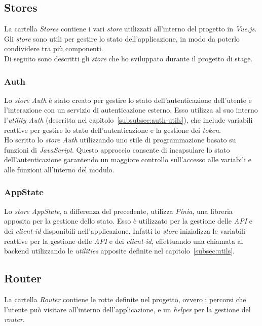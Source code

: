 \subsection{Stores}\label{subsec:store}
La cartella \textit{Stores} contiene i vari \textit{store} utilizzati all'interno del progetto in \textit{Vue.js}. Gli \textit{store} sono utili per gestire lo stato dell'applicazione,
in modo da poterlo condividere tra più componenti.\\
Di seguito sono descritti gli \textit{store} che ho sviluppato durante il progetto di stage.

\subsubsection{Auth}\label{subsubsec:auth-store}
Lo \textit{store Auth} è stato creato per gestire lo stato dell'autenticazione dell'utente e l'interazione con un servizio di autenticazione esterno.
Esso utilizza al suo interno l'\textit{utility Auth} (descritta nel capitolo~\ref{subsubsec:auth-utils}), che include variabili reattive per gestire lo stato dell'autenticazione e la gestione dei \textit{token}.\\
Ho scritto lo \textit{store Auth} utilizzando uno stile di programmazione basato su funzioni  di \textit{JavaScript}. Questo approccio consente di incapsulare
lo stato dell'autenticazione garantendo un maggiore controllo sull'accesso alle variabili e alle funzioni all'interno del modulo.

\subsubsection{AppState}\label{subsubsec:app-state}
Lo \textit{store AppState}, a differenza del precedente, utilizza \textit{Pinia}, una libreria apposita per la gestione dello stato.
Esso è utilizzato per la gestione delle \textit{API} e dei \textit{client-id} disponibili nell'applicazione. Infatti lo \textit{store} inizializza le variabili reattive per la gestione
delle \textit{API} e dei \textit{client-id}, effettuando una chiamata al backend utilizzando le \textit{utilities} apposite definite nel capitolo~\ref{subsec:utils}.

\subsection{Router}\label{subsec:router}
La cartella \textit{Router} contiene le rotte definite nel progetto, ovvero i percorsi che l'utente può visitare all'interno dell'applicazione, e un \textit{helper} per la gestione del \textit{router}.
